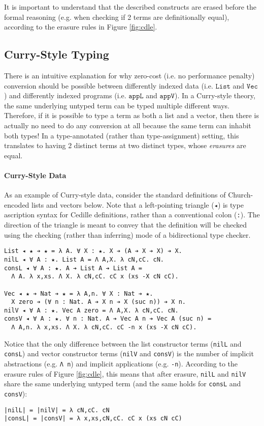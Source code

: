 \documentclass[acmsmall]{acmart}\settopmatter{}
\newcommand{\labsec}[1]{\label{sec:#1}}
\newcommand{\reffig}[1]{Figure \ref{fig:#1}}
\newcommand{\txt}[1]{\ensuremath{\texttt{#1}}}
\begin{document}
It is important to understand that the described constructs are erased
before the formal reasoning (e.g. when checking if 2 terms are
definitionally equal), according to the erasure rules in
\reffig{cdle}.

\subsection{Curry-Style Typing}
\labsec{back:curry}

There is an intuitive explanation for why zero-cost (i.e. no
performance penalty) conversion should be possible
between differently indexed data (i.e. \txt{List} and \txt{Vec}) and
differently indexed programs (i.e. \txt{appL} and
\txt{appV}). In a Curry-style theory, the same
underlying untyped term can be typed multiple different
ways. Therefore, if it is possible to type a term as both a list and a
vector, then there is actually no need to do any conversion at all
because the same term can inhabit both types! In a type-annotated
(rather than type-assignment) setting, this translates to having 2
distinct terms at two distinct types, whose \textit{erasures} are equal.

\paragraph{Curry-Style Data}
As an example of Curry-style data, consider the standard definitions
of Church-encoded lists and vectors below. Note that a left-pointing
triangle (\verb;◂;) is type ascription syntax for Cedille definitions,
rather than a conventional colon (\verb;:;). The direction of the
triangle is meant to convey that the definition will be checked using
the checking (rather than inferring) mode of a bidirectional type
checker.
\begin{verbatim}
List ◂ ★ ➔ ★ = λ A. ∀ X : ★. X ➔ (A ➔ X ➔ X) ➔ X.
nilL ◂ ∀ A : ★. List A = Λ A,X. λ cN,cC. cN.
consL ◂ ∀ A : ★. A ➔ List A ➔ List A =
  Λ A. λ x,xs. Λ X. λ cN,cC. cC x (xs -X cN cC).

Vec ◂ ★ ➔ Nat ➔ ★ = λ A,n. ∀ X : Nat ➔ ★.
  X zero ➔ (∀ n : Nat. A ➔ X n ➔ X (suc n)) ➔ X n.
nilV ◂ ∀ A : ★. Vec A zero = Λ A,X. λ cN,cC. cN.
consV ◂ ∀ A : ★. ∀ n : Nat. A ➔ Vec A n ➔ Vec A (suc n) =
  Λ A,n. λ x,xs. Λ X. λ cN,cC. cC -n x (xs -X cN cC).
\end{verbatim}
Notice that the only difference between the list constructor terms
(\verb;nilL; and \verb;consL;) and vector constructor terms
(\verb;nilV; and \verb;consV;) is the number of implicit
abstractions (e.g. \verb;Λ n;) and implicit applications
(e.g. \verb;-n;). According to the erasure rules of \reffig{cdle},
this means that after erasure, \verb;nilL; and \verb;nilV; share the
same underlying untyped term
(and the same holds for \verb;consL; and \verb;consV;):
\begin{verbatim}
|nilL| = |nilV| = λ cN,cC. cN
|consL| = |consV| = λ x,xs,cN,cC. cC x (xs cN cC)
\end{verbatim}
\end{document}
